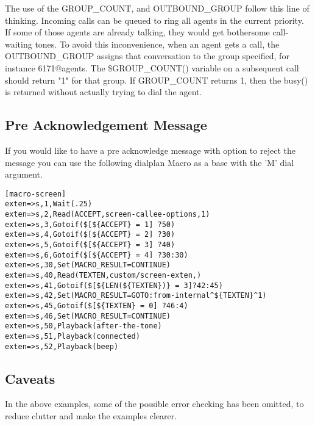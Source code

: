 The use of the GROUP\_COUNT, and OUTBOUND\_GROUP follow this line
of thinking. Incoming calls can be queued to ring all agents in the
current priority. If some of those agents are already talking, they
would get bothersome call-waiting tones. To avoid this inconvenience,
when an agent gets a call, the OUTBOUND\_GROUP assigns that
conversation to the group specified, for instance 6171@agents.
The \${GROUP\_COUNT()} variable on a subsequent call should return
"1" for that group. If GROUP\_COUNT returns 1, then the busy()
is returned without actually trying to dial the agent.

\subsection{Pre Acknowledgement Message}

If you would like to have a pre acknowledge message with option to reject the message
you can use the following dialplan Macro as a base with the 'M' dial argument.

\begin{astlisting}
\begin{verbatim}
[macro-screen]
exten=>s,1,Wait(.25)
exten=>s,2,Read(ACCEPT,screen-callee-options,1)
exten=>s,3,Gotoif($[${ACCEPT} = 1] ?50)
exten=>s,4,Gotoif($[${ACCEPT} = 2] ?30)
exten=>s,5,Gotoif($[${ACCEPT} = 3] ?40)
exten=>s,6,Gotoif($[${ACCEPT} = 4] ?30:30)
exten=>s,30,Set(MACRO_RESULT=CONTINUE)
exten=>s,40,Read(TEXTEN,custom/screen-exten,)
exten=>s,41,Gotoif($[${LEN(${TEXTEN})} = 3]?42:45)
exten=>s,42,Set(MACRO_RESULT=GOTO:from-internal^${TEXTEN}^1)
exten=>s,45,Gotoif($[${TEXTEN} = 0] ?46:4)
exten=>s,46,Set(MACRO_RESULT=CONTINUE)
exten=>s,50,Playback(after-the-tone)
exten=>s,51,Playback(connected)
exten=>s,52,Playback(beep)
\end{verbatim}
\end{astlisting}

\subsection{Caveats}

In the above examples, some of the possible error checking has been omitted,
to reduce clutter and make the examples clearer.
